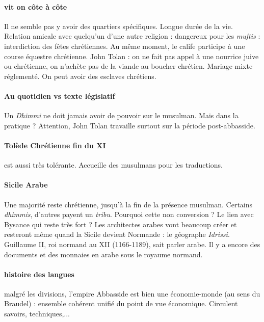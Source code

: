 \paragraph{vit on côte à côte} Il ne semble pas y avoir des quartiers spécifiques. Longue durée de la vie. Relation amicale avec quelqu'un d'une autre religion : dangereux pour les \textit{muftis} : interdiction des fêtes chrétiennes. Au même moment, le calife participe à une course équestre chrétienne. 
John Tolan : on ne fait pas appel à une nourrice juive ou chrétienne, on n'achète pas de la viande au boucher chrétien. Mariage mixte réglementé. On peut avoir des esclaves chrétiens.


\paragraph{Au quotidien vs texte législatif} Un \textit{Dhimmi} ne doit jamais avoir de pouvoir sur le musulman. Mais dans la pratique ? Attention, John Tolan travaille surtout sur la période post-abbasside. 

\paragraph{Tolède Chrétienne fin du XI} est aussi très tolérante. Accueille des musulmans pour les traductions.


\paragraph{Sicile Arabe} Une majorité reste chrétienne, jusqu'à la fin de la présence musulman. Certains \textit{dhimmis}, d'autres payent un \textit{tribu}. Pourquoi cette non conversion ? Le lien avec Bysance qui reste très fort ? Les architectes arabes vont beaucoup créer et resteront même quand la Sicile devient Normande : le géographe \textit{Idrissi}. Guillaume II, roi normand au XII (1166-1189), sait parler arabe. Il y a encore des documents et des monnaies en arabe sous le royaume normand.

\paragraph{histoire des langues} 


\begin{Synthesis}
    malgré les divisions, l'empire Abbasside est bien une économie-monde (au sens du Braudel) : ensemble cohérent unifié du point de vue économique. Circulent savoirs, techniques,...
    
\end{Synthesis}
